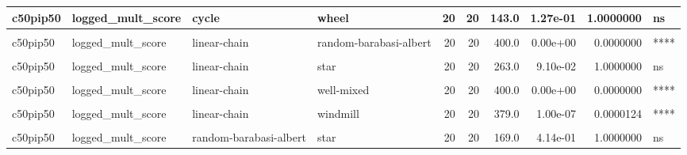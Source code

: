 \documentclass[
]{book}
\begin{document}
\begin{table}
\begin{tabular}{l|l|l|l|r|r|r|r|r|l}
\hline
c50pip50 & logged\_mult\_score & cycle & wheel & 20 & 20 & 143.0 & 1.27e-01 & 1.0000000 & ns\\
\hline
\cellcolor{gray!6}{c50pip50} & \cellcolor{gray!6}{logged\_mult\_score} & \cellcolor{gray!6}{cycle} & \cellcolor{gray!6}{windmill} & \cellcolor{gray!6}{20} & \cellcolor{gray!6}{20} & \cellcolor{gray!6}{395.0} & \cellcolor{gray!6}{0.00e+00} & \cellcolor{gray!6}{0.0000001} & \cellcolor{gray!6}{****}\\
\hline
c50pip50 & logged\_mult\_score & linear-chain & random-barabasi-albert & 20 & 20 & 400.0 & 0.00e+00 & 0.0000000 & ****\\
\hline
\cellcolor{gray!6}{c50pip50} & \cellcolor{gray!6}{logged\_mult\_score} & \cellcolor{gray!6}{linear-chain} & \cellcolor{gray!6}{random-waxman} & \cellcolor{gray!6}{20} & \cellcolor{gray!6}{20} & \cellcolor{gray!6}{348.0} & \cellcolor{gray!6}{2.14e-05} & \cellcolor{gray!6}{0.0035952} & \cellcolor{gray!6}{**}\\
\hline
c50pip50 & logged\_mult\_score & linear-chain & star & 20 & 20 & 263.0 & 9.10e-02 & 1.0000000 & ns\\
\hline
\cellcolor{gray!6}{c50pip50} & \cellcolor{gray!6}{logged\_mult\_score} & \cellcolor{gray!6}{linear-chain} & \cellcolor{gray!6}{toroidal-lattice} & \cellcolor{gray!6}{20} & \cellcolor{gray!6}{20} & \cellcolor{gray!6}{324.0} & \cellcolor{gray!6}{5.31e-04} & \cellcolor{gray!6}{0.0780570} & \cellcolor{gray!6}{ns}\\
\hline
c50pip50 & logged\_mult\_score & linear-chain & well-mixed & 20 & 20 & 400.0 & 0.00e+00 & 0.0000000 & ****\\
\hline
\cellcolor{gray!6}{c50pip50} & \cellcolor{gray!6}{logged\_mult\_score} & \cellcolor{gray!6}{linear-chain} & \cellcolor{gray!6}{wheel} & \cellcolor{gray!6}{20} & \cellcolor{gray!6}{20} & \cellcolor{gray!6}{121.0} & \cellcolor{gray!6}{3.30e-02} & \cellcolor{gray!6}{1.0000000} & \cellcolor{gray!6}{ns}\\
\hline
c50pip50 & logged\_mult\_score & linear-chain & windmill & 20 & 20 & 379.0 & 1.00e-07 & 0.0000124 & ****\\
\hline
\cellcolor{gray!6}{c50pip50} & \cellcolor{gray!6}{logged\_mult\_score} & \cellcolor{gray!6}{random-barabasi-albert} & \cellcolor{gray!6}{random-waxman} & \cellcolor{gray!6}{20} & \cellcolor{gray!6}{20} & \cellcolor{gray!6}{70.0} & \cellcolor{gray!6}{2.58e-04} & \cellcolor{gray!6}{0.0387000} & \cellcolor{gray!6}{*}\\
\hline
c50pip50 & logged\_mult\_score & random-barabasi-albert & star & 20 & 20 & 169.0 & 4.14e-01 & 1.0000000 & ns\\

\end{tabular}
\end{table}
\end{document}
